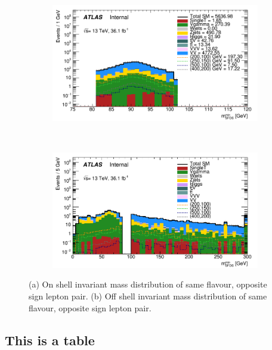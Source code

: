 \begin{figure}[H]
    \centering
    \begin{subfigure}[b]{0.48\textwidth}
        \centering
        \includegraphics[width=\textwidth]{Pictures/OnMassShell.png}
    \caption{}
    \end{subfigure}
    ~
    \begin{subfigure}[b]{0.48\textwidth}
        \centering
        \includegraphics[width=\textwidth]{Pictures/OffMassShell.png}
    \caption{}    
        \end{subfigure}
\caption{(a) On shell invariant mass distribution of same flavour, opposite sign lepton pair.
(b) Off shell invariant mass distribution of same flavour, opposite sign lepton pair.}
\label{fig:ATLAS}
\end{figure}

\subsection{This is a table}

